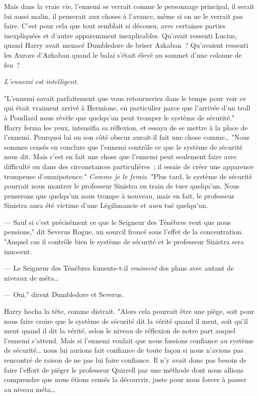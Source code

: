 Mais dans la vraie vie, l'ennemi se verrait comme le personnage principal, il serait lui aussi malin, il penserait aux choses à l'avance, même si on ne le verrait pas faire. C'est pour cela que tout semblait si décousu, avec certaines parties inexpliquées et d'autre apparemment inexplicables. Qu'avait ressenti Lucius, quand Harry avait menacé Dumbledore de briser Azkaban~? Qu'avaient ressenti les Aurors d'Azkaban quand le balai s'était élevé au sommet d'une colonne de feu~?

\emph{L'ennemi est intelligent.}

"L'ennemi savait parfaitement que vous retourneriez dans le temps pour voir ce qui était vraiment arrivé à Hermione, en particulier parce que l'arrivée d'un troll à Poudlard nous révèle que quelqu'un peut tromper le système de sécurité." Harry ferma les yeux, intensifia sa réflexion, et essaya de se mettre à la place de l'ennemi. Pourquoi lui ou son côté obscur aurait-il fait une chose comme… "Nous sommes censés en conclure que l'ennemi contrôle ce que le système de sécurité nous dit. Mais c'est en fait une chose que l'ennemi peut seulement faire avec difficulté ou dans des circonstances particulières~; il essaie de créer une apparence trompeuse d'omnipotence." \emph{Comme je le ferais.} "Plus tard, le système de sécurité pourrait nous montrer le professeur Sinistra en train de tuer quelqu'un. Nous penserons que quelqu'un nous trompe à nouveau, mais en fait, le professeur Sinistra aura été victime d'une Légilimancie et \emph{aura} tué quelqu'un.

--- Sauf si c'est précisément ce que le Seigneur des Ténèbres veut que nous pensions," dit Severus Rogue, un sourcil froncé sous l'effet de la concentration. "Auquel cas il contrôle bien le système de sécurité et le professeur Sinistra sera innocent.

--- Le Seigneur des Ténèbres fomente-t-il \emph{vraiment} des plans avec autant de niveaux de méta…

--- Oui," dirent Dumbledore et Severus.

Harry hocha la tête, comme distrait. "Alors cela pourrait être une piège, soit pour nous faire croire que le système de sécurité dit la vérité quand il ment, soit qu'il ment quand il dit la vérité, selon le niveau de réflexion de notre part auquel l'ennemi s'attend. Mais si l'ennemi voulait que nous fassions confiance au système de sécurité… nous lui aurions fait confiance de toute façon si nous n'avions pas rencontré de raison de ne pas lui faire confiance. Il n'y avait donc pas besoin de faire l'effort de piéger le professeur Quirrell par une méthode dont nous allions comprendre que nous étions censés la découvrir, juste pour nous forcer à passer au niveau méta…

